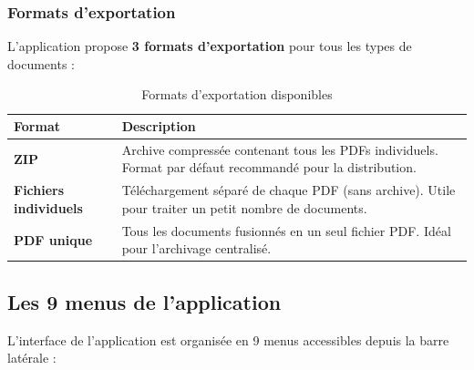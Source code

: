 \subsubsection{Formats d'exportation}

L'application propose \textbf{3 formats d'exportation} pour tous les types de documents :

\begin{table}[h]
\centering
\begin{tabular}{|l|p{10cm}|}
\hline
\textbf{Format} & \textbf{Description} \\
\hline
\textbf{ZIP} & Archive compressée contenant tous les PDFs individuels. Format par défaut recommandé pour la distribution. \\
\hline
\textbf{Fichiers individuels} & Téléchargement séparé de chaque PDF (sans archive). Utile pour traiter un petit nombre de documents. \\
\hline
\textbf{PDF unique} & Tous les documents fusionnés en un seul fichier PDF. Idéal pour l'archivage centralisé. \\
\hline
\end{tabular}
\caption{Formats d'exportation disponibles}
\end{table}

\subsection{Les 9 menus de l'application}

L'interface de l'application est organisée en 9 menus accessibles depuis la barre latérale :

